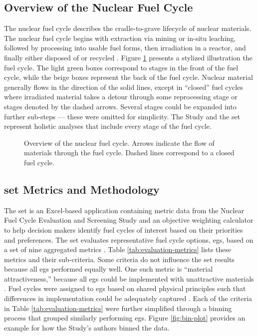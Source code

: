 \subsection{Overview of the Nuclear Fuel Cycle}

The nuclear fuel cycle describes the cradle-to-grave lifecycle of nuclear
materials. The nuclear fuel cycle begins with extraction via mining or in-situ
leaching, followed by processing into usable fuel forms, then irradiation in a reactor,
and finally either disposed of or recycled \cite{tsoulfanidis_review_2013}. Figure
\ref{fig:nuclear-fuel-cycle} presents a stylized illustration the fuel cycle.
The light green boxes correspond to stages in the front of the fuel cycle, while
the beige boxes represent the back of the fuel cycle. Nuclear material generally
flows in the direction of the solid lines, except in ``closed'' fuel cycles
where irradiated material takes a detour through some reprocessing stage or
stages denoted by the dashed arrows. Several stages could be expanded into
further sub-steps --- these were omitted for simplicity. The Study and the
\ac{set} represent holistic analyses that include every stage of the fuel cycle.

\begin{figure}[htbp!]
  \centering
  \resizebox{\columnwidth}{!}{}
  \caption{Overview of the nuclear fuel cycle. Arrows indicate the flow of
  materials through the fuel cycle. Dashed lines correspond to a closed fuel
  cycle.}
  \label{fig:nuclear-fuel-cycle}
\end{figure}

\subsection{\ac{set} Metrics and Methodology}

The \ac{set} is an Excel-based application containing metric data from the
Nuclear Fuel Cycle Evaluation and Screening Study \cite{wigeland_nuclear_2014}
and an objective weighting calculator to help decision makers identify fuel
cycles of interest based on their priorities and preferences. The \ac{set}
evaluates representative fuel cycle options, \acp{eg}, based on a set of nine
aggregated metrics \cite{wigeland_nuclear_2014}. Table
\ref{tab:evaluation-metrics} lists these metrics and their sub-criteria. Some
criteria do not influence the \ac{set} results because all \acp{eg} performed
equally well. One such metric is ``material attractiveness,'' because all \acp{eg} could be
implemented with unattractive materials \cite{wigeland_nuclear_2014-1}. Fuel
cycles were assigned to \acp{eg} based on shared physical principles such that
differences in implementation could be adequately captured \cite{wigeland_nuclear_2014}.  
Each of the criteria in Table \ref{tab:evaluation-metrics} were further simplified 
through a binning process that grouped similarly performing \acp{eg}. Figure 
\ref{fig:bin-plot} provides an example for how the Study's authors binned the data.

